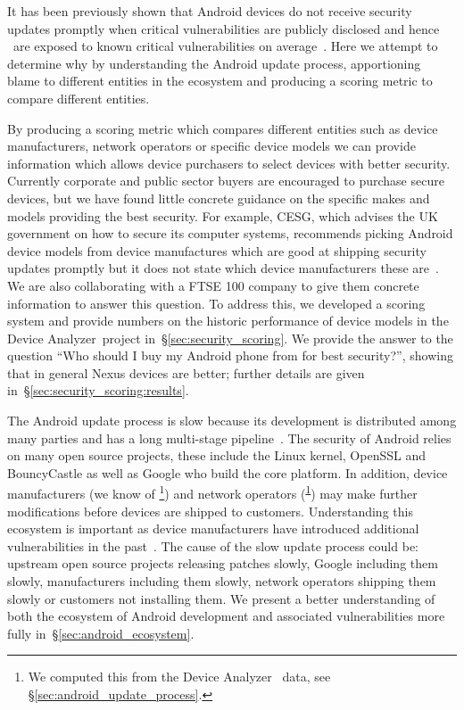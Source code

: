 \documentclass{sig-alternate}
\newcommand{\da}{Device Analyzer}
\newcommand{\dafoot}{\textsuperscript{\ref{foot:dadata}}}
\begin{document}
It has been previously shown that Android devices do not receive security updates promptly when critical vulnerabilities are publicly disclosed and hence \daMeanInsecurityPercNominal\ are exposed to known critical vulnerabilities on average~\cite{androidvulnerabilities.org}.
Here we attempt to determine why by understanding the Android update process, apportioning blame to different entities in the ecosystem and producing a scoring metric to compare different entities.

By producing a scoring metric which compares different entities such as device manufacturers, network operators or specific device models we can provide information which allows device purchasers to select devices with better security.
Currently corporate and public sector buyers are encouraged to purchase secure devices, but we have found little concrete guidance on the specific makes and models providing the best security.
For example, CESG, which advises the UK government on how to secure its computer systems, recommends picking Android device models from device manufactures which are good at shipping security updates promptly but it does not state which device manufacturers these are~\cite{CESG2013}.
We are also collaborating with a FTSE 100 company to give them concrete information to answer this question.
To address this, we developed a scoring system and provide numbers on the historic performance of device models in the \da\ project in~\S\ref{sec:security_scoring}.
We provide the answer to the question ``Who should I buy my Android phone from for best security?'', showing that in general Nexus devices are better; further details are given in~\S\ref{sec:security_scoring:results}.

The Android update process is slow because its development is distributed among many parties and has a long multi-stage pipeline~\cite{HTC2013}.
The security of Android relies on many open source projects, these include the Linux kernel, OpenSSL and BouncyCastle as well as Google who build the core platform.
In addition, device manufacturers (we know of \daNumManufacturers\footnote{\label{foot:dadata}We computed this from the \da~\cite{Wagner2013} data, see \S\ref{sec:android_update_process}.}) and network operators (\daNumOperators\dafoot) may make further modifications before devices are shipped to customers.
Understanding this ecosystem is important as device manufacturers have introduced additional vulnerabilities in the past~\cite{Grace2012}.
The cause of the slow update process could be: upstream open source projects releasing patches slowly, Google including them slowly, manufacturers including them slowly, network operators shipping them slowly or customers not installing them.
We present a better understanding of both the ecosystem of Android development and associated vulnerabilities more fully in~\S\ref{sec:android_ecosystem}.
\end{document}
